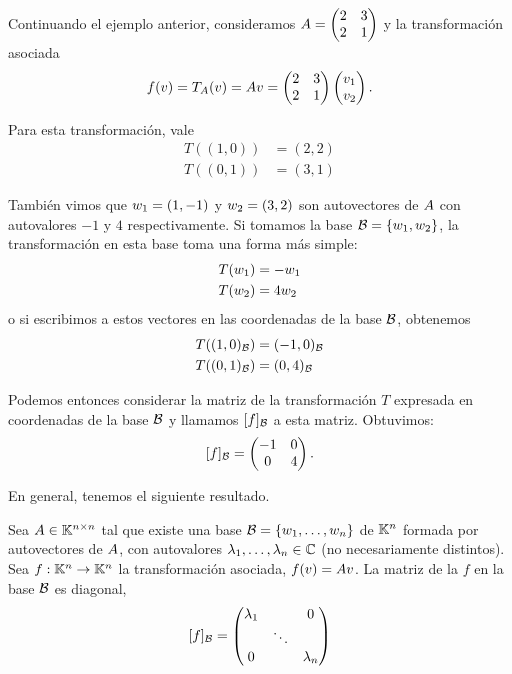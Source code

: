\begin{ejemplo} Continuando el ejemplo anterior, consideramos
$\Ab = \begin{pmatrix} 2 & 3 \\ 2 & 1 \end{pmatrix}$ y la transformación asociada
$$f(\vb) = T_{\Ab}(\vb) = \Ab \vb = \begin{pmatrix} 2 & 3 \\ 2 & 1 \end{pmatrix} \begin{pmatrix} v_1 \\ v_2 \end{pmatrix}.$$

Para esta transformación, vale
$$
\begin{aligned}
T((1,0)) &= (2, 2) \\
T((0,1)) &= (3, 1)
\end{aligned}
$$

También vimos que $\wb_1 = (1,-1)$ y $\wb_2 = (3,2)$ son autovectores de $\Ab$ con autovalores $-1$ y $4$ respectivamente.
Si tomamos la base $\B = \{\wb_1, \wb_2\}$, la transformación en esta base toma una forma más simple:
$$
\begin{aligned}
T(\wb_1) &= -\wb_1 \\
T(\wb_2) &= 4\wb_2
\end{aligned}
$$
o si escribimos a estos vectores en las coordenadas de la base $\mathcal B$, obtenemos
$$
\begin{aligned}
T((1,0)_\mathcal B) &= (-1,0)_\mathcal B \\
T((0,1)_\mathcal B) &= (0,4)_\mathcal B \\
\end{aligned}
$$

Podemos entonces considerar la matriz de la transformación $T$ expresada en coordenadas de la base $\mathcal B$ y llamamos $[f]_\mathcal B$ a esta matriz. Obtuvimos:
$$
[f]_\mathcal B = \begin{pmatrix} -1 & 0 \\ 0 & 4 \end{pmatrix}.
$$

\end{ejemplo}

En general, tenemos el siguiente resultado.

\begin{prop}
Sea $\Ab \in \Knn$ tal que existe una base $\B = \{\wb_1, \dots, \wb_n\}$ de $\mathbb K^{n}$ formada por autovectores de $\Ab$, con autovalores $\lambda_1, \dots, \lambda_n \in \mathbb C$ (no necesariamente distintos). Sea $f: \mathbb K^{n} \rightarrow \mathbb K^{n}$ la transformación asociada, $f(\vb) = \Ab \vb$. La matriz de la $f$ en la base $\mathcal B$ es diagonal,
$$
[f]_\mathcal B =
\begin{pmatrix} \lambda_1 & & 0 \\ & \ddots & \\ 0 & & \lambda_n \end{pmatrix}
$$

\end{prop}

